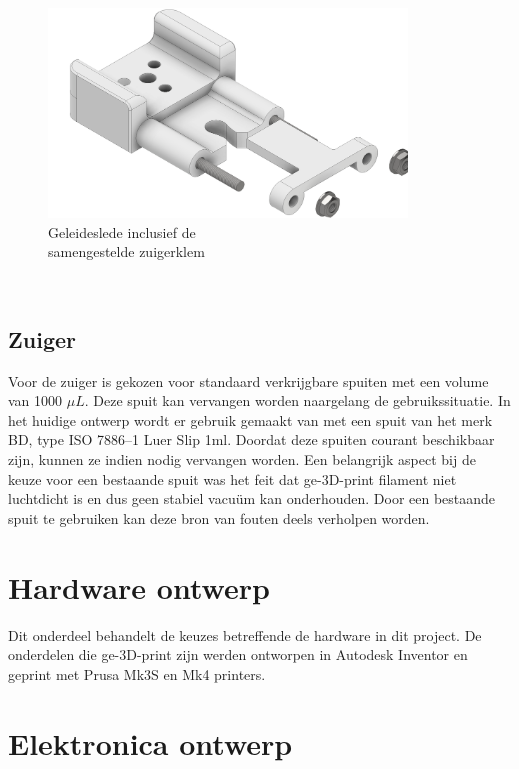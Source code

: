 \begin{minipage}[t]{0.59\textwidth}
    \vspace{0pt}
    \begin{figure}[H]
        \centering
        \includegraphics[width=0.85\textwidth]{figures/CarriageAndClamp.png}
        \caption{Geleideslede inclusief de \\samengestelde zuigerklem}\label{fig:CarriageAndClamp}
    \end{figure}
\end{minipage}\\

\subsection{Zuiger}
Voor de zuiger is gekozen voor standaard verkrijgbare spuiten met een volume van 1000 $\mu L$. Deze spuit kan vervangen worden naargelang de gebruikssituatie. In het huidige ontwerp wordt er gebruik gemaakt van met een spuit van het merk BD, type ISO 7886--1 Luer Slip 1ml. Doordat deze spuiten courant beschikbaar zijn, kunnen ze indien nodig vervangen worden.
Een belangrijk aspect bij de keuze voor een bestaande spuit was het feit dat ge-3D-print filament niet luchtdicht is en dus geen stabiel vacuüm kan onderhouden. Door een bestaande spuit te gebruiken kan deze bron van fouten deels verholpen worden.


\section{Hardware ontwerp}
Dit onderdeel behandelt de keuzes betreffende de hardware in dit project. De onderdelen die ge-3D-print zijn werden ontworpen in Autodesk Inventor en geprint met Prusa Mk3S en Mk4 printers.

\section{Elektronica ontwerp}
